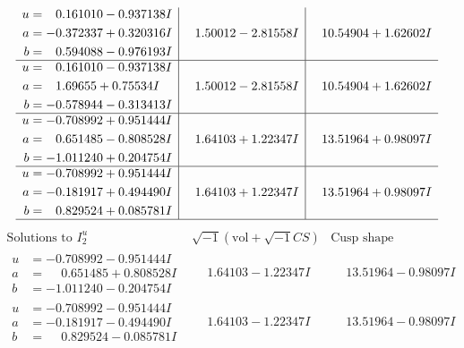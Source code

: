 \documentclass[1p]{elsarticle_modified}
\theoremstyle{definition}
\newcommand{\I}{\sqrt{-1}}
\begin{document}
$$\begin{array}{c|c|c}
\begin{aligned}
u &= \phantom{-}0.161010 - 0.937138 I \\
a &= -0.372337 + 0.320316 I \\
b &= \phantom{-}0.594088 - 0.976193 I\end{aligned}
 & \phantom{-}1.50012 - 2.81558 I & \phantom{-}10.54904 + 1.62602 I \\ \hline\begin{aligned}
u &= \phantom{-}0.161010 - 0.937138 I \\
a &= \phantom{-}1.69655 + 0.75534 I \\
b &= -0.578944 - 0.313413 I\end{aligned}
 & \phantom{-}1.50012 - 2.81558 I & \phantom{-}10.54904 + 1.62602 I \\ \hline\begin{aligned}
u &= -0.708992 + 0.951444 I \\
a &= \phantom{-}0.651485 - 0.808528 I \\
b &= -1.011240 + 0.204754 I\end{aligned}
 & \phantom{-}1.64103 + 1.22347 I & \phantom{-}13.51964 + 0.98097 I \\ \hline\begin{aligned}
u &= -0.708992 + 0.951444 I \\
a &= -0.181917 + 0.494490 I \\
b &= \phantom{-}0.829524 + 0.085781 I\end{aligned}
 & \phantom{-}1.64103 + 1.22347 I & \phantom{-}13.51964 + 0.98097 I\\
 \hline 
 \end{array}$$\newpage$$\begin{array}{c|c|c}  
\text{Solutions to }I^u_{2}& \I (\text{vol} + \sqrt{-1}CS) & \text{Cusp shape}\\
 \hline 
\begin{aligned}
u &= -0.708992 - 0.951444 I \\
a &= \phantom{-}0.651485 + 0.808528 I \\
b &= -1.011240 - 0.204754 I\end{aligned}
 & \phantom{-}1.64103 - 1.22347 I & \phantom{-}13.51964 - 0.98097 I \\ \hline\begin{aligned}
u &= -0.708992 - 0.951444 I \\
a &= -0.181917 - 0.494490 I \\
b &= \phantom{-}0.829524 - 0.085781 I\end{aligned}
 & \phantom{-}1.64103 - 1.22347 I & \phantom{-}13.51964 - 0.98097 I \\ \hline\begin{aligned}

\end{aligned}
\end{array}$$
\end{document}
